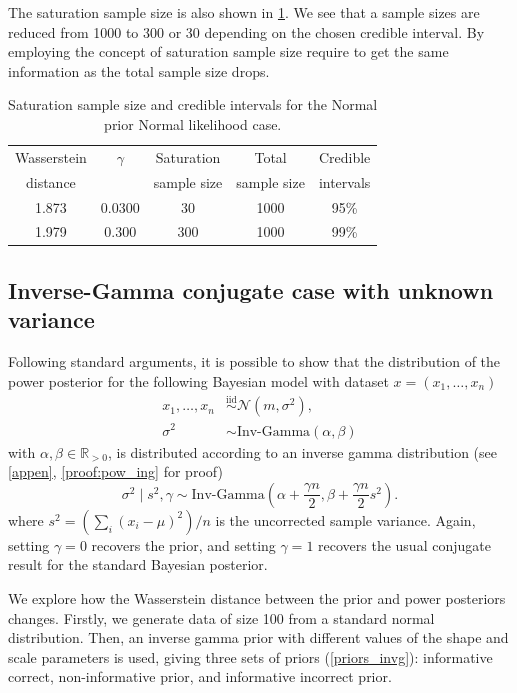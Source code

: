 \documentclass[12pt]{article}
\begin{document}
The saturation sample size is also shown in \cref{tab:satsize}. We see that a sample sizes are reduced from 1000 to 300 or 30 depending on the chosen credible interval. By employing the concept of saturation sample size require to get the same information as the total sample size drops. 


\begin{table}[h]
	\caption{Saturation sample size and credible intervals for the Normal prior Normal likelihood case.}
	\renewcommand{\arraystretch}{1.5}
	\centering
		\begin{tabular}{ccccc} 
			\hline
			Wasserstein & $\gamma$ & Saturation & Total & Credible\\
			distance& &sample size& sample size& intervals\\ [0.5ex] 
			\hline 
			1.873 & 0.0300 & 30 & 1000 & 95\%\\
			1.979 & 0.300 & 300 & 1000 & 99\% \\
			\hline
		\end{tabular}
	\label{tab:satsize}
\end{table}
\FloatBarrier
\subsection{Inverse-Gamma conjugate case with unknown variance}
Following standard arguments, it is possible to show that the distribution of
the power posterior for the following Bayesian model with dataset $x = (x_1,
\ldots, x_n)$
\begin{subequations}
\begin{align}
x_1, \ldots, x_n &\overset{\mathrm{iid}}{\sim} \mathcal{N}(m, \sigma^2), \\
\sigma^2 &\sim \text{Inv-Gamma}(\alpha, \beta)
\end{align}
\end{subequations}
with $\alpha, \beta \in \mathbb{R}_{>0}$, is distributed according to an
inverse gamma distribution (see \cref{appen}, \cref{proof:pow_ing} for proof)
\begin{equation*}
\sigma^2 \; | \; s^2, \gamma \sim \text{Inv-Gamma}\left( \alpha + \frac{\gamma n}{2}, \beta + \frac{\gamma n}{2} s^2 \right). 
\end{equation*}
where $s^2 = (\sum_{i} \left( x_i - \mu \right)^2)/n$ is the uncorrected sample
variance. Again, setting $\gamma = 0$ recovers the prior, and setting $\gamma =
1$ recovers the usual conjugate result for the standard Bayesian posterior.

We explore how the Wasserstein distance between the prior and power posteriors changes. Firstly, we generate data of size 100 from a standard normal distribution. Then, an inverse gamma prior with different values of the shape and scale parameters is used, giving three sets of priors (\cref{priors_invg}): informative correct, non-informative prior, and informative incorrect prior.
\end{document}
